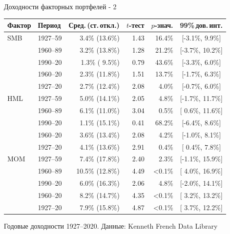 \documentclass{beamer}
\begin{document}
\begin{frame}{Доходности факторных портфелей - 2}
\centering
\small
\begin{tabular}{l|l|r|r|r|c}
Фактор & Период & Сред.\,(ст.\,откл.) & $t$-тест & $p$-знач. & 99\%\,дов.\,инт.\\ \hline
SMB & 1927--59 &  3.4\% (13.6\%) & 1.43 & 16.4\% & [-3.1\%,  9.9\%] \\    
    & 1960--89 &  3.2\% (13.8\%) & 1.28 & 21.2\% & [-3.7\%, 10.2\%] \\
    & 1990--20 &  1.3\% ( 9.5\%) & 0.79 & 43.6\% & [-3.3\%,  6.0\%] \\    
    & 1960--20 &  2.3\% (11.8\%) & 1.51 & 13.7\% & [-1.7\%,  6.3\%] \\ 
    & 1927--20 &  2.7\% (12.4\%) & 2.08 &  4.0\% & [-0.7\%,  6.0\%] \\    
\hline
HML & 1927--59 &  5.0\% (14.1\%) & 2.05 &  4.8\% & [-1.7\%, 11.7\%] \\    
    & 1960--89 &  6.1\% (11.0\%) & 3.04 &  0.5\% & [ 0.6\%, 11.6\%] \\     
    & 1990--20 &  1.1\% (15.1\%) & 0.41 & 68.2\% & [-6.4\%,  8.6\%] \\    
    & 1960--20 &  3.6\% (13.4\%) & 2.08 &  4.2\% & [-1.0\%,  8.1\%] \\     
    & 1927--20 &  4.1\% (13.6\%) & 2.91 &  0.4\% & [ 0.4\%,  7.8\%] \\      
\hline
MOM & 1927--59 &  7.4\% (17.8\%) & 2.40 &  2.3\% & [-1.1\%, 15.9\%] \\    
    & 1960--89 & 10.5\% (12.8\%) & 4.49 & <0.1\% & [ 4.0\%, 16.9\%] \\ 
    & 1990--20 &  6.0\% (16.3\%) & 2.06 &  4.8\% & [-2.0\%, 14.1\%] \\  
    & 1960--20 &  8.2\% (14.7\%) & 4.35 & <0.1\% & [ 3.2\%, 13.2\%] \\  
    & 1927--20 &  7.9\% (15.8\%) & 4.87 & <0.1\% & [ 3.7\%, 12.2\%] \\  
\hline
\end{tabular}

{\scriptsize Годовые доходности 1927--2020. Данные: Kenneth French Data Library}
\end{frame}
\end{document}
